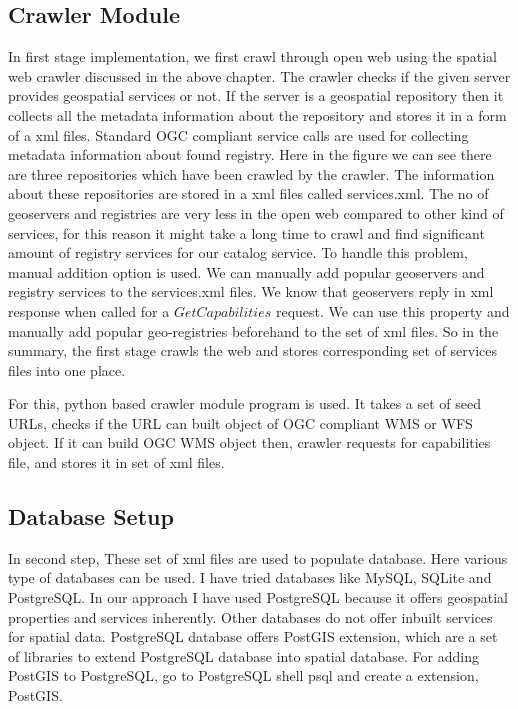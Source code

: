 \subsection{Crawler Module}

In first stage implementation, we first crawl through open web using the spatial web crawler discussed in the above chapter. The crawler checks if the given server provides geospatial services or not. If the server is a geospatial repository then it collects all the metadata information about the repository and stores it in a form of a xml files. Standard OGC compliant service calls are used for collecting metadata information about found registry. Here in the figure we can see there are three repositories which have been crawled by the crawler. The information about these repositories are stored in a xml files called services.xml. The no of geoservers and registries are very less in the open web compared to other kind of services, for this reason it might take a long time to crawl and find significant amount of registry services for our catalog service. To handle this problem, manual addition option is used. We can manually add popular geoservers and registry services to the services.xml files. We know that geoservers reply in xml response when called for a $GetCapabilities$ request. We can use this property and manually add popular geo-registries beforehand to the set of xml files. So in the summary, the first stage crawls the web and stores corresponding set of services files into one place.
\newline
\par For this, python based crawler module program is used. It takes a set of seed URLs, checks if the URL can built object of OGC compliant WMS or WFS object. If it can build OGC WMS object then, crawler requests for capabilities file, and stores it in set of xml files.


\subsection{Database Setup}
In second step, These set of xml files are used to populate database. Here various type of databases can be used. I have tried databases like MySQL, SQLite and PostgreSQL. In our approach I have used PostgreSQL because it offers geospatial properties and services inherently. Other databases do not offer inbuilt services for spatial data. PostgreSQL database offers PostGIS extension, which are a set of libraries to extend PostgreSQL database into spatial database. For adding PostGIS to PostgreSQL, go to PostgreSQL shell psql and create a extension, PostGIS. 

